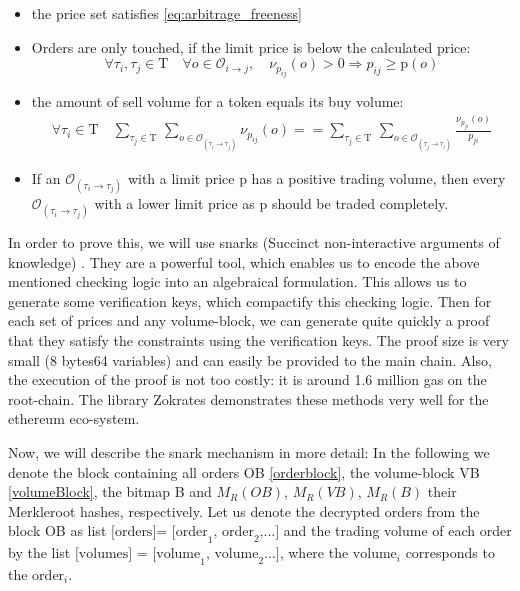 \documentclass[11pt,parskip=full]{scrartcl}%
\newcommand{\Tau}{\mathrm{T}}
\def\pO{\mathcal{O}}
\def\ra{\rightarrow}
\begin{document}
\begin{itemize}

\item the price set satisfies \ref{eq:arbitrage_freeness} 
\item Orders are only touched, if the limit price is below the calculated price:\newline
\begin{equation} \forall \tau_i ,\tau_j \in \Tau \quad \forall o \in \pO_{i\ra j}, \quad \nu_{p_{ij}}(o)>0 \Rightarrow p_{ij}\geq \text{p}(o)
\end{equation}
\item the amount of sell volume for a token equals its buy volume: 
\begin{equation}
\begin{split}
\forall \tau_i \in \Tau \quad \sum_{\tau_j\in \Tau} \,
\sum_{ o\in \pO_{(\tau_i \rightarrow \tau_j)}} \nu_{p_{ij}}(o) == \sum_{\tau_j\in \Tau} \, \sum_{o\in \pO_{(\tau_j\rightarrow \tau_i)}} \frac{\nu_{p_{ji}}(o)}{p_{ji}}
\end{split}
\end{equation}
\item If an $\pO_{(\tau_i\rightarrow \tau_j)}$ with a limit price p has a positive trading volume, then every $\pO_{(\tau_i\rightarrow \tau_j)}$ with a lower limit price as p should be traded completely. 
\end{itemize}


In order to prove this, we will use snarks (Succinct non-interactive arguments of knowledge) \cite{snarks}. 
They are a powerful tool, which enables us to encode the above mentioned checking logic into an algebraical formulation. 
This allows us to generate some verification keys, which compactify this checking logic. 
Then for each set of prices and any volume-block, we can generate quite quickly a proof that they satisfy the constraints using the verification keys. 
The proof size is very small (8 bytes64 variables) and can easily be provided to the main chain. 
Also, the execution of the proof is not too costly: it is around 1.6 million gas on the root-chain. 
The library Zokrates demonstrates these methods very well for the ethereum eco-system. 

Now, we will describe the snark mechanism in more detail: 
In the following we denote the block containing all orders OB \ref{orderblock}, the volume-block VB \ref{volumeBlock}, the bitmap B and $M_R(OB)$, $M_R(VB)$, $M_R(B)$ their Merkleroot hashes, respectively.
Let us denote the decrypted orders from the block OB as list $\text{[orders]= [order}_1\text{, order}_2\text{,...]}$ and the trading volume of each order by the list $\text{[volumes] = [volume}_1\text{, volume}_2\text{...]}$, where the $\text{volume}_i$ corresponds to the $\text{order}_i$. 
\end{document}
